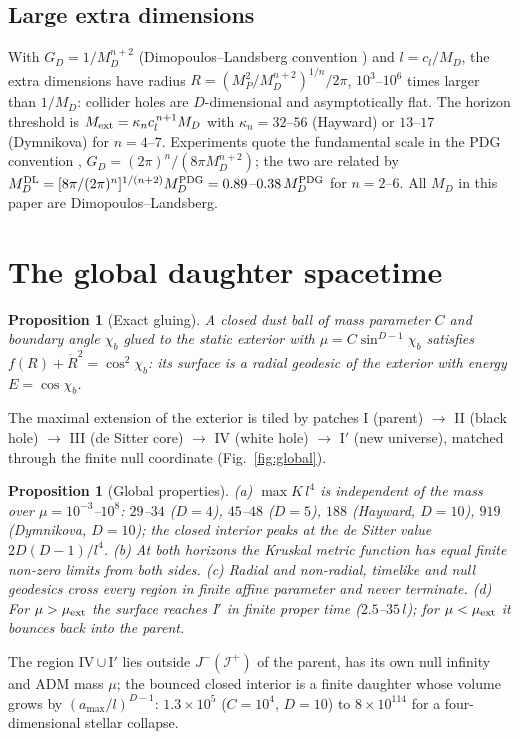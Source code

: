 \documentclass[11pt,a4paper]{article}
\newtheorem{proposition}[theorem]{Proposition}
\theoremstyle{remark}\newtheorem{remark}[theorem]{Remark}
\begin{document}
\subsection{Large extra dimensions}
With $G_D=1/M_D^{n+2}$ (Dimopoulos--Landsberg convention \cite{DL01}) and $l=c_l/M_D$, the extra dimensions have radius
$R=(M_P^2/M_D^{n+2})^{1/n}/2\pi$, $10^3$--$10^6$ times larger than $1/M_D$: collider holes are $D$-dimensional and asymptotically flat. The
horizon threshold is $M_{\rm ext}=\kappa_n c_l^{\,n+1}M_D$ with $\kappa_n=32$--$56$ (Hayward) or $13$--$17$ (Dymnikova) for $n=4$--$7$.
Experiments quote the fundamental scale in the PDG convention \cite{GRW99}, $G_D=(2\pi)^n/(8\pi M_D^{n+2})$; the two are related by
$M_D^{\rm DL}=[8\pi/(2\pi)^n]^{1/(n+2)}M_D^{\rm PDG}=0.89$--$0.38\,M_D^{\rm PDG}$ for $n=2$--$6$. All $M_D$ in this paper are
Dimopoulos--Landsberg.

\section{The global daughter spacetime}
\begin{proposition}[Exact gluing]
A closed dust ball of mass parameter $C$ and boundary angle $\chi_b$ glued to the static exterior with $\mu=C\sin^{D-1}\chi_b$ satisfies
$f(R)+\dot R^2=\cos^2\chi_b$: its surface is a radial geodesic of the exterior with energy $E=\cos\chi_b$.
\end{proposition}
The maximal extension of the exterior is tiled by patches I (parent) $\to$ II (black hole) $\to$ III (de Sitter core) $\to$ IV (white hole)
$\to$ I$'$ (new universe), matched through the finite null coordinate (Fig.~\ref{fig:global}).
\begin{proposition}[Global properties]
(a) $\max K\,l^4$ is independent of the mass over $\mu=10^{-3}$--$10^8$: $29$--$34$ ($D=4$), $45$--$48$ ($D=5$), $188$ (Hayward, $D=10$),
$919$ (Dymnikova, $D=10$); the closed interior peaks at the de Sitter value $2D(D-1)/l^4$. (b) At both horizons the Kruskal metric
function has equal finite non-zero limits from both sides. (c) Radial and non-radial, timelike and null geodesics cross every region in
finite affine parameter and never terminate. (d) For $\mu>\mu_{\rm ext}$ the surface reaches I$'$ in finite proper time ($2.5$--$35\,l$);
for $\mu<\mu_{\rm ext}$ it bounces back into the parent.
\end{proposition}
The region IV\,$\cup$\,I$'$ lies outside $J^-(\mathcal I^+)$ of the parent, has its own null infinity and ADM mass $\mu$; the bounced closed
interior is a finite daughter whose volume grows by $(a_{\max}/l)^{D-1}$: $1.3\times10^5$ ($C=10^4$, $D=10$) to $8\times10^{114}$ for a
four-dimensional stellar collapse.
\end{document}
